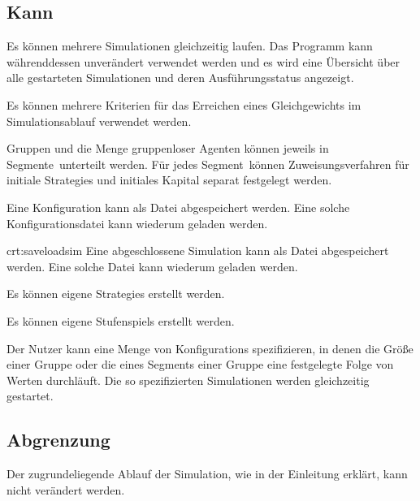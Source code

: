 \documentclass[parskip=full,11pt]{scrartcl}
\def\segment{Segment}
\def\segments{Segmente}
\begin{document}
\subsection{Kann}

Es können mehrere Simulationen gleichzeitig laufen. Das Programm kann währenddessen unverändert verwendet werden und es wird eine Übersicht über alle gestarteten Simulationen und deren Ausführungsstatus angezeigt.

Es können mehrere Kriterien für das Erreichen eines \Gls{Gleichgewicht}s im Simulationsablauf verwendet werden.

Gruppen und die Menge \gls{gruppenloser Agent}en können jeweils in \segments\ unterteilt werden. Für jedes \segment\ können Zuweisungsverfahren für initiale \Glspl{Strategie} und initiales \Gls{Kapital} separat festgelegt werden.

Eine \Gls{Konfiguration} kann als Datei abgespeichert werden. Eine solche Konfigurationsdatei kann wiederum geladen werden.

{crt:saveloadsim}
Eine abgeschlossene Simulation kann als Datei abgespeichert werden. Eine solche Datei kann wiederum geladen werden.

Es können eigene \Glspl{Strategie} erstellt werden.

Es können eigene \Glspl{Stufenspiel} erstellt werden.

Der \Gls{Nutzer} kann eine Menge von \Glspl{Konfiguration} spezifizieren, in denen die Größe einer Gruppe oder die eines \segment s einer Gruppe eine festgelegte Folge von Werten durchläuft. Die so spezifizierten Simulationen werden gleichzeitig gestartet.

\subsection{Abgrenzung}

Der zugrundeliegende Ablauf der Simulation, wie in der Einleitung erklärt, kann nicht verändert werden.
\end{document}
